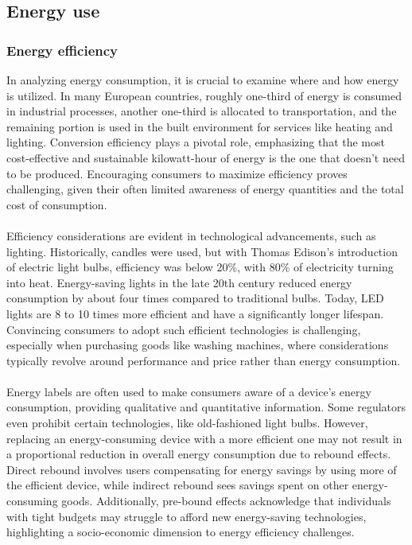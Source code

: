 \documentclass[../summary.tex]{subfiles}
\begin{document}
\subsection{Energy use}
\subsubsection{Energy efficiency}

In analyzing energy consumption, it is crucial to examine where and how energy is utilized. In many European countries, roughly one-third of energy is consumed in industrial processes, another one-third is allocated to transportation, and the remaining portion is used in the built environment for services like heating and lighting. Conversion efficiency plays a pivotal role, emphasizing that the most cost-effective and sustainable kilowatt-hour of energy is the one that doesn't need to be produced. Encouraging consumers to maximize efficiency proves challenging, given their often limited awareness of energy quantities and the total cost of consumption.\\
\\
Efficiency considerations are evident in technological advancements, such as lighting. Historically, candles were used, but with Thomas Edison's introduction of electric light bulbs, efficiency was below 20\%, with 80\% of electricity turning into heat. Energy-saving lights in the late 20th century reduced energy consumption by about four times compared to traditional bulbs. Today, LED lights are 8 to 10 times more efficient and have a significantly longer lifespan. Convincing consumers to adopt such efficient technologies is challenging, especially when purchasing goods like washing machines, where considerations typically revolve around performance and price rather than energy consumption.\\
\\
Energy labels are often used to make consumers aware of a device's energy consumption, providing qualitative and quantitative information. Some regulators even prohibit certain technologies, like old-fashioned light bulbs. However, replacing an energy-consuming device with a more efficient one may not result in a proportional reduction in overall energy consumption due to rebound effects. Direct rebound involves users compensating for energy savings by using more of the efficient device, while indirect rebound sees savings spent on other energy-consuming goods. Additionally, pre-bound effects acknowledge that individuals with tight budgets may struggle to afford new energy-saving technologies, highlighting a socio-economic dimension to energy efficiency challenges.
\newpage
\ \\
\end{document}
